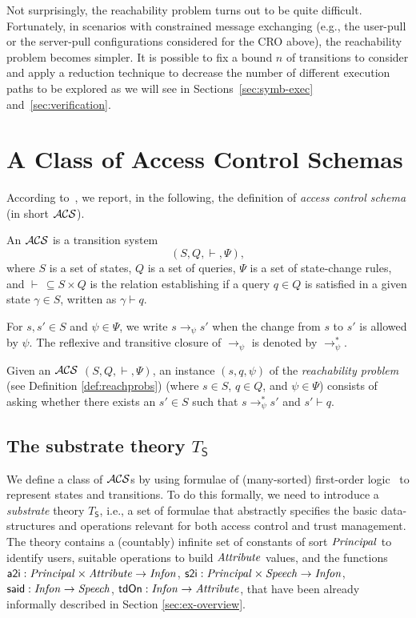 \documentclass[conference]{llncs}
\newcommand{\principal}{\ensuremath \mathit{Principal}}
\newcommand{\infon}{\ensuremath \mathit{Infon}}
\newcommand{\attribute}{\ensuremath \mathit{Attribute}}
\newcommand{\speech}{\ensuremath \mathit{Speech}}
\newcommand{\atoi}{\ensuremath \mathsf{a2i}}
\newcommand{\stoi}{\ensuremath \mathsf{s2i}}
\newcommand{\said}{\ensuremath \mathsf{said}}
\newcommand{\tdOn}{\ensuremath \mathsf{tdOn}}
\newcommand{\CRO}{CRO}
\newcommand{\acs}{\ensuremath \mathcal{ACS}}
\begin{document}
Not surprisingly, the reachability problem turns out to be quite
difficult.
Fortunately, in scenarios with constrained message exchanging (e.g., the user-pull or the
server-pull configurations considered for the \CRO{} above), the
reachability problem becomes simpler. It is possible to fix a bound $n$
of transitions to consider and apply a reduction technique to decrease 
the number of different execution paths to be explored as we will see in 
Sections~\ref{sec:symb-exec} and~\ref{sec:verification}.

\section{A Class of Access Control Schemas}
\label{sec:DKAL-light}

According to~\cite{lietal2005}, we report, in the following, the definition of \emph{access control schema} (in short $\acs$).

\begin{definition}
\label{acss}
An $\acs$ is a transition system 
$$(S, Q, \vdash,\Psi), $$ 
where $S$ is a set of states, $Q$ is a set of queries, $\Psi$ is a set of state-change rules, and $\vdash\, \subseteq S\times Q$ is the relation establishing if a query
$q\in Q$ is satisfied in a given state $\gamma\in S$, written as
$\gamma \vdash q$. 
\end{definition}

For $s, s'\in S$ and $\psi\in \Psi$, we write $s
\rightarrow_{\psi} s'$ when the change from $s$ to $s'$ is allowed by
$\psi$. The reflexive and transitive closure of $\rightarrow_{\psi}$
is denoted by $\rightarrow_{\psi}^*$. 

Given an $\acs$ $(S, Q, \vdash, \Psi)$, an instance $(s, q, \psi)$ of the
\emph{reachability problem} (see Definition \ref{def:reachprobs}) (where $s\in S$, $q\in Q$, and $\psi\in \Psi$) consists of asking whether there exists an $s'\in S$ such that
$s \rightarrow_{\psi}^* s'$ and $s' \vdash q$.


\subsection{The substrate theory $T_{\mathsf{S}}$} 
\label{subsec:substh}
We define a class of
$\acs$s by using formulae of (many-sorted) first-order
logic~\cite{enderton} to represent states and transitions. To do this
formally, we need to introduce a \emph{substrate} theory
$T_{\mathsf{S}}$, i.e., a set of formulae that abstractly specifies the
basic data-structures and operations relevant for both access control
and trust management. The theory contains a (countably) infinite set of
constants of sort $\principal$ to identify users, suitable operations to
build $\attribute$ values, 
and the functions $\atoi:\principal \times
\attribute \rightarrow \infon$, $\stoi : \principal \times
\speech \rightarrow \infon$, $\said: \infon \rightarrow \speech$,  $\tdOn :
\infon \rightarrow \attribute$, that have been already informally described in Section \ref{sec:ex-overview}.
\end{document}
